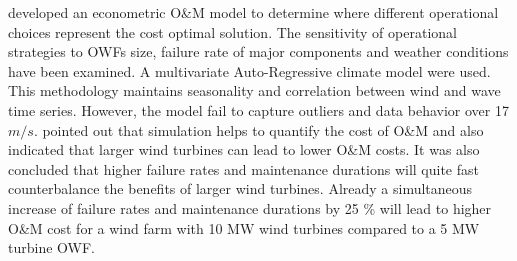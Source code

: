 \cite{dinwoodie2013} developed an econometric O\&M model to determine where different operational choices represent the cost optimal solution. The sensitivity of operational strategies to OWFs size, failure rate of major components and weather conditions have been examined. A multivariate Auto-Regressive climate model were used. This methodology maintains seasonality and correlation between wind and wave time series. However, the model fail to capture outliers and data behavior over 17 $m/s$. \cite{Hofmann2014} pointed out that simulation helps to quantify the cost of O\&M and also indicated that larger wind turbines can lead to lower O\&M costs. It was also concluded that higher failure rates and maintenance durations will quite fast counterbalance the benefits of larger wind turbines. Already a simultaneous increase of failure rates and maintenance durations by 25 \% will lead to higher O\&M cost for a wind farm with 10 MW wind turbines compared to a 5 MW turbine OWF. 
